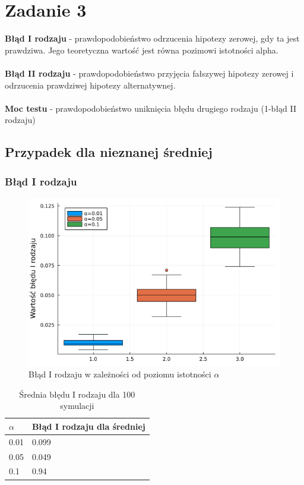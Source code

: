 \documentclass{article}
\theoremstyle{break}
\begin{document}
\section*{Zadanie 3}
\textbf{Błąd I rodzaju} - prawdopodobieństwo odrzucenia hipotezy zerowej, gdy ta jest prawdziwa. Jego teoretyczna wartość jest równa pozimowi istotności alpha.\\ \\
\textbf{Błąd II rodzaju} - prawdopodobieństwo przyjęcia fałszywej hipotezy zerowej i odrzucenia prawdziwej hipotezy alternatywnej.\\ \\ 
\textbf{Moc testu} - prawdopodobieństwo uniknięcia błędu drugiego rodzaju (1-błąd II rodzaju)
\subsection*{Przypadek dla nieznanej średniej} 
\subsubsection*{Błąd I rodzaju}
\begin{figure}[H]
	\begin{center}
		\includegraphics[scale=0.5]{Z3.Irodzaj.png}
		\caption{Błąd I rodzaju w zależności od poziomu istotności $\alpha$}
	\end{center}
\end{figure}

\begin{table}[H]
	\begin{center}
	\begin{tabular}{|l|l|}
		\hline
		\rowcolor[HTML]{EFEFEF} 
		$\alpha$ & Błąd I rodzaju dla średniej \\ \hline
		0.01 & 0.099                         \\ \hline
		0.05 & 0.049                         \\ \hline
		0.1  & 0.94                         \\ \hline
	\end{tabular}
\caption{Średnia błędu I rodzaju dla 100 symulacji}
	\end{center}
\end{table}
\end{document}
